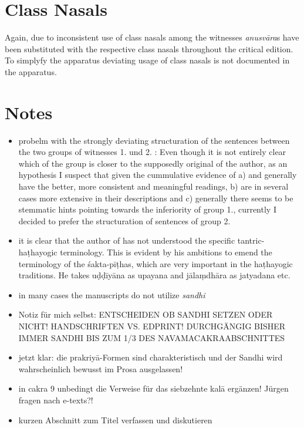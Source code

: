 \documentclass[11pt,showtrims]{memoir}
\begin{document}
\section{Class Nasals}

Again, due to inconsistent use of class nasals among the witnesses \textit{anusvāra}s have been substituted with the respective class nasals throughout the critical edition. To simplyfy the apparatus deviating usage of class nasals is not documented in the apparatus. 

\section{Notes}
\begin{itemize}
\item probelm with the strongly deviating structuration of the sentences between the two groups of witnesses 1. \edprint \pune \lalchand \oxford und 2. \nepal \dehlia: Even though it is not entirely clear which of the group is closer to the supposedly original of the author, as an hypothesis I suspect that given the cummulative evidence of a) \nepal and \dehlia generally have the better, more consistent and meaningful readings, b) are in several cases more extensive in their descriptions and c) generally there seems to be stemmatic hints pointing towards the inferiority of group 1., currently I decided to prefer the structuration of sentences of group 2.
\item it is clear that the author of \edprint has not understood the specific tantric-haṭhayogic terminology. This is evident by his ambitions to emend the terminology of the śakta-pīṭhas, which are very important in the haṭhayogic traditions. He takes uḍḍīyāna as upayana and jālaṃdhāra as jatyadana etc.
\item in many cases the manuscripts do not utilize \textit{sandhi}
\item Notiz für mich selbst: ENTSCHEIDEN OB SANDHI SETZEN ODER NICHT! HANDSCHRIFTEN VS. EDPRINT! DURCHGÄNGIG BISHER IMMER SANDHI BIS ZUM 1/3 DES NAVAMACAKRAABSCHNITTES
\item jetzt klar: die prakriyā-Formen sind charakteristisch und der Sandhi wird wahrscheinlich bewusst im Prosa ausgelassen!
\item in cakra 9 unbedingt die Verweise für das siebzehnte kalā ergänzen! Jürgen fragen nach e-texts?!
\item kurzen Abschnitt zum Titel verfassen und diskutieren 
\end{itemize}
\end{document}
